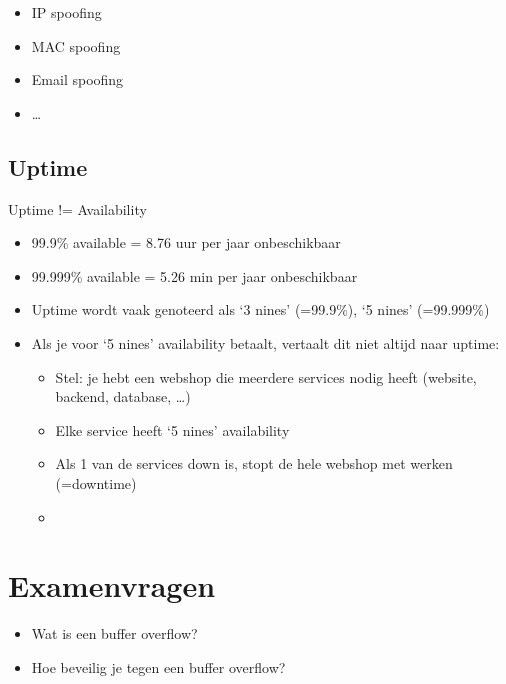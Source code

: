 \documentclass{article}
\begin{document}
\begin{itemize}
    \item IP spoofing
    \item MAC spoofing
    \item Email spoofing
    \item \dots
\end{itemize}

\subsection{Uptime}

Uptime != Availability

\begin{itemize}
    \item 99.9\% available = 8.76 uur per jaar onbeschikbaar
    \item 99.999\% available = 5.26 min per jaar onbeschikbaar
    \item Uptime wordt vaak genoteerd als `3 nines' (=99.9\%), `5 nines' (=99.999\%)
    \item Als je voor `5 nines' availability betaalt, vertaalt dit niet altijd naar uptime:
    \begin{itemize}
        \item Stel: je hebt een webshop die meerdere services nodig heeft (website, backend, database, \dots)
        \item Elke service heeft `5 nines' availability
        \item Als 1 van de services down is, stopt de hele webshop met werken (=downtime)
        \item 
    \end{itemize}

\end{itemize}

\section{Examenvragen}

\begin{itemize}
    \item Wat is een buffer overflow?
    \item Hoe beveilig je tegen een buffer overflow?
\end{itemize}
\end{document}
